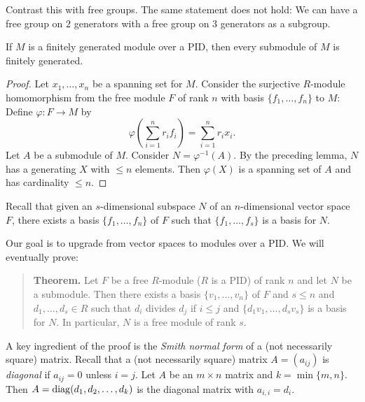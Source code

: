 \begin{remark}
  Contrast this with free groups. The same statement
  does not hold: We can have a free
  group on $2$ generators with a free group on $3$
  generators as a subgroup.
\end{remark}

\begin{corollary}
  If $M$ is a finitely generated module over a PID, then
  every submodule of $M$ is finitely generated.
\end{corollary}

\begin{proof}
  Let $x_1, \dots, x_n$ be a spanning set for $M$.
  Consider the surjective $R$-module homomorphism from the free
  module $F$ of rank $n$ with basis $\{f_1, \dots, f_n\}$
  to $M$: Define $\varphi : F \to M$ by
  \[
    \varphi\left(\sum_{i = 1}^n r_i f_i\right) = \sum_{i = 1}^n r_i x_i.
  \]
  Let $A$ be a submodule of $M$. Consider
  $N = \varphi^{-1}(A)$. By the preceding lemma, $N$
  has a generating $X$ with $\le n$ elements. Then
  $\varphi(X)$ is a spanning set of $A$ and
  has cardinality $\le n$.
\end{proof}

\begin{remark}
  Recall that given an $s$-dimensional subspace $N$ of
  an $n$-dimensional vector space $F$, there exists a
  basis $\{f_1, \dots, f_n\}$ of $F$ such that
  $\{f_1, \dots, f_s\}$ is a basis for $N$.
\end{remark}

\begin{remark}
  Our goal is to upgrade from vector spaces to modules
  over a PID. We will eventually prove:
  \begin{quote}
    \textbf{Theorem.}
    Let $F$ be a free $R$-module ($R$ is a PID) of rank $n$ and let
    $N$ be a submodule. Then there exists a basis
    $\{v_1, \dots, v_n\}$ of $F$ and $s \le n$ and
    $d_1, \dots, d_s \in R$ such that $d_i$ divides
    $d_j$ if $i \le j$ and $\{d_1 v_1, \dots, d_s v_s\}$
    is a basis for $N$. In particular, $N$ is a free
    module of rank $s$.
  \end{quote}
  A key ingredient of the proof is the \emph{Smith normal form}
  of a (not necessarily square) matrix. Recall that
  a (not necessarily square) matrix $A = (a_{ij})$
  is \emph{diagonal} if $a_{ij} = 0$ unless $i = j$.
  Let $A$ be an $m \times n$ matrix and $k = \min\{m, n\}$.
  Then $A = \operatorname{diag}(d_1, d_2, \dots, d_k)$ is the diagonal
  matrix with $a_{i, i} = d_i$.
\end{remark}
